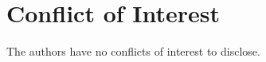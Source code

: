 \documentclass[12pt]{article}
\begin{document}









\section*{Conflict of Interest}
The authors have no conflicts of interest to disclose.

\newpage
{}

\nocite{*}
\end{document}
